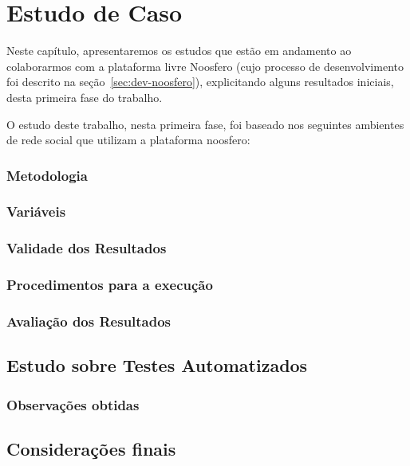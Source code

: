 \chapter{Estudo de Caso}

Neste capítulo, apresentaremos os estudos que estão em andamento ao colaborarmos com a plataforma livre Noosfero (cujo processo de desenvolvimento foi descrito na seção~\ref{sec:dev-noosfero}), explicitando alguns resultados iniciais, desta primeira fase do trabalho.

O estudo deste trabalho, nesta primeira fase, foi baseado nos seguintes ambientes de
rede social que utilizam a plataforma noosfero:
%



\subsection{Metodologia}


\subsection{Variáveis}
 

\subsection{Validade dos Resultados}



\subsection{Procedimentos para a execução}


\subsection{Avaliação dos Resultados}


\section {Estudo sobre Testes Automatizados}


\subsection{Observações obtidas}



\section{Considerações finais}







